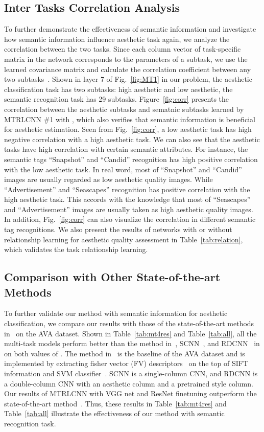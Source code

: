 \documentclass[journal]{IEEEtran}
\begin{document}
\subsection{Inter Tasks Correlation Analysis}
To further demonstrate the effectiveness of semantic information and investigate how semantic information influence aesthetic task again, we analyze the correlation between the two tasks. Since each column vector of task-specific matrix  in the network corresponds to the parameters of a subtask, we use the learned covariance matrix  and calculate the correlation coefficient between any two subtasks~\cite{fan2002sas}. Shown in layer 7 of Fig.~\ref{fig:MT1} in our problem, the aesthetic classification task has two subtasks: high aesthetic and low aesthetic, the semantic recognition task has 29 subtasks. Figure~\ref{fig:corr} presents the correlation between the aesthetic subtasks and sematnic subtasks learned by MTRLCNN \#1 with , which also verifies that semantic information is beneficial for aesthetic estimation. Seen from Fig.~\ref{fig:corr}, a low aesthetic task has high negative correlation with a high aesthetic task. We can also see that the aesthetic tasks have high correlation with certain semantic attributes. For instance, the semantic tags ``Snapshot'' and ``Candid'' recognition has high positive correlation with the low aesthetic task. In real word, most of ``Snapshot'' and ``Candid'' images are usually regarded as low aesthetic quality images. While ``Advertisement'' and ``Seascapes'' recognition has positive correlation with the high aesthetic task. This accords with the knowledge that most of ``Seascapes'' and ``Advertisement'' images are usually taken as high aesthetic quality images. In addition, Fig.~\ref{fig:corr} can also visualize the correlation in different semantic tag recognitions. We also present the results of networks with or without relationship learning for aesthetic quality assessment in Table~\ref{tab:relation}, which validates the task relationship learning.


\subsection{Comparison with Other State-of-the-art Methods  }
To further validate our method with semantic information for aesthetic classification, we compare our results with those of the state-of-the-art methods in~\cite{Murray12,lu14,lu2015deep,mai2016composition} on the AVA dataset. Shown in Table~\ref{tab:mt4res} and Table~\ref{tab:all}, all the multi-task models perform better than the method in~\cite{Murray12}, SCNN~\cite{lu14}, and RDCNN~\cite{lu14} in on both values of . The method in~\cite{Murray12} is the baseline of the AVA dataset and is implemented by extracting fisher vector (FV) descriptors~\cite{FV07} on the top of SIFT~\cite{Mar11} information and SVM classifier~\cite{CC01a}. SCNN is a single-column CNN, and RDCNN is a double-column CNN with an aesthetic column and a pretrained style column. Our results of MTRLCNN with VGG net and ResNet finetuning outperform the state-of-the-art method~\cite{mai2016composition}. Thus, these results in Table~\ref{tab:mt4res} and Table~\ref{tab:all} illustrate the effectiveness of our method with semantic recognition task.
\end{document}
